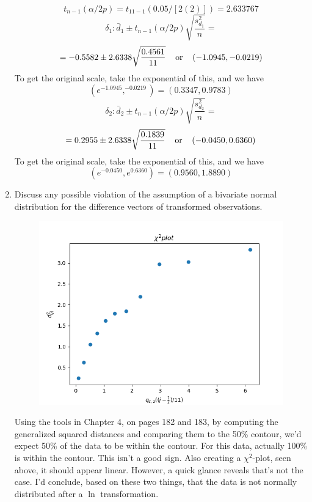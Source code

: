 \begin{enumerate}[label= (\alph*)]
    \[
        t_{n-1}(\alpha/2p)
        =
        t_{11-1}(0.05/[2(2)])
        =
        2.633767
    \]
    \[
        \delta_{1}:
        \bar{d}_{1}
        \pm
        t_{n - 1}(\alpha/2p)
        \sqrt{ \frac{ s_{d_{1}}^{2} }{n} }
        =
    \]
    \[
        =
        -0.5582
        \pm
        2.6338
        \sqrt{ \frac{ 0.4561 }{ 11 } }
        \hspace{0.4cm}\text{or}\hspace{0.4cm}
        (-1.0945, -0.0219)
    \]
    To get the original scale, take the exponential of this, and we have
    \[
        (e^{-1.0945}, ^{-0.0219})
        =
        (0.3347, 0.9783)
    \]
    \[
        \delta_{2}:
        \bar{d}_{2}
        \pm
        t_{n - 1}(\alpha/2p)
        \sqrt{ \frac{ s_{d_{2}}^{2} }{n} }
        =
    \]
    \[
        =
        0.2955
        \pm
        2.6338
        \sqrt{ \frac{ 0.1839 }{ 11 } }
        \hspace{0.4cm}\text{or}\hspace{0.4cm}
        (-0.0450, 0.6360)
    \]
    To get the original scale, take the exponential of this, and we have
    \[
        (e^{-0.0450}, e^{0.6360})
        =
        (0.9560, 1.8890)
    \]

    \item Discuss any possible violation of the assumption of a bivariate normal distribution
    for the difference vectors of transformed observations.

    \begin{figure}[H]
        \centering
        \includegraphics[scale=0.70]{./python/chapter-6/Question-6-4-c.png}
    \end{figure}

    Using the tools in Chapter 4, on pages 182 and 183, by computing the generalized squared distances and comparing them to the 50\% contour, we'd expect 50\% of the data to be within the contour. For this data, actually 100\% is within the contour. This isn't a good sign.
    Also creating a $\chi^{2}$-plot, seen above, it should appear linear. However, a quick glance reveals that's not the case. I'd conclude, based on these two things, that the data is not normally distributed after a $\ln$ transformation.

\end{enumerate}